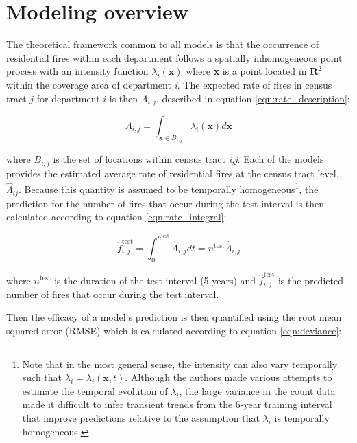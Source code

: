 \documentclass{svjour3}
\begin{document}
\section{Modeling overview}
The theoretical framework common to all models is that the occurrence of residential fires within each department follows a spatially inhomogeneous point process with an intensity function $\lambda_{i}(\textbf{x})$ 
where \textbf{x} is a point located in $\textbf{R}^2$ within the coverage area of department \textit{i}. The expected rate of fires in census tract $j$ for department $i$ is then $\Lambda_{i,j}$, described in equation \ref{eqn:rate_description}:

\begin{equation}
  \label{eqn:rate_description}
  \Lambda_{i,j} = \int_{\mathbf{x} \in B_{i,j}}  \lambda_{i}(\textbf{x})d\textbf{x}
\end{equation}

\noindent where $B_{i,j}$ is the set of locations within census tract \textit{i,j}. Each of the models provides the estimated average rate of residential fires at the census tract level, $\hat\Lambda_{ij}$. Because this quantity is assumed to be temporally homogeneous\footnote{Note that in the most general sense, the intensity can also vary temporally such that $\lambda_i = \lambda_i(\textbf{x},t)$. Although the authors made various attempts to estimate the temporal evolution of $\lambda_i$, the large variance in the count data made it difficult to infer transient trends from the 6-year training interval that improve predictions relative to the assumption that $\lambda_i$ is temporally homogeneous.}, the prediction for the number of fires that occur during the test interval is then calculated according to equation \ref{eqn:rate_integral}: 

\begin{equation}
  \label{eqn:rate_integral}
  \hat{f}^{\text{test}}_{i,j} = \int_{0}^{n^{\text{test}}}\hat\Lambda_{i,j}dt
  = n^{\text{test}}\hat\Lambda_{i,j}
\end{equation}

\noindent where $n^{\text{test}}$ is the duration of the test interval (5 years) and $\hat{f}^{\text{test}}_{i,j}$ is the predicted number of fires that occur during the test interval.

Then the efficacy of a model's prediction is then quantified using the root mean squared error (RMSE) which is calculated according to equation \ref{eqn:deviance}:

\end{document}
